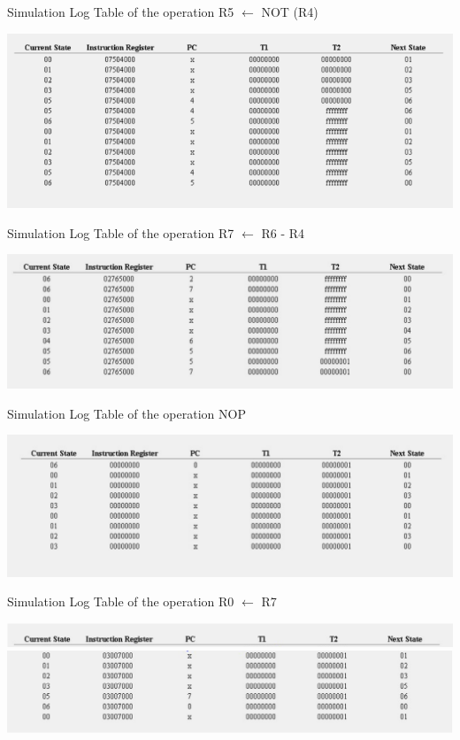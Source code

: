 \documentclass{article}
\begin{document}
	\begin{table}[!ht]
		\centering
		\caption{Simulation Log Table of the operation R5 $\leftarrow$ NOT (R4)}
		\vspace{0.2cm}
		\includegraphics[width=0.9\linewidth]{op07504000.png}		
	\end{table}

	\begin{table}[!ht]
		\centering
		\caption{Simulation Log Table of the operation R7 $\leftarrow$ R6 - R4}
		\vspace{0.2cm}
		\includegraphics[width=0.9\linewidth]{op02765000.png}	
	\end{table}	

	\pagebreak

	\begin{table}[!ht]
		\centering
		\caption{Simulation Log Table of the operation NOP}
		\vspace{0.2cm}
		\includegraphics[width=0.9\linewidth]{op00.png}
	\end{table}	

	\begin{table}[!ht]
		\centering
		\caption{Simulation Log Table of the operation R0 $\leftarrow$ R7}
		\vspace{0.2cm}
		\includegraphics[width=0.9\linewidth]{op03007000_part1.png}
		\includegraphics[width=0.9\linewidth]{op03007000_part2.png}	
	\end{table}	
	
\end{document}
